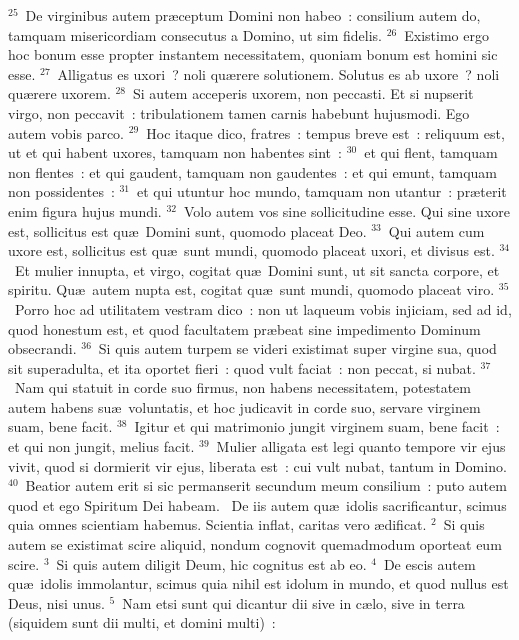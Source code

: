 ${}^{25}$~De virginibus autem pr\ae ceptum Domini non habeo~: consilium autem do, tamquam misericordiam consecutus a Domino, ut sim fidelis.
${}^{26}$~Existimo ergo hoc bonum esse propter instantem necessitatem, quoniam bonum est homini sic esse.
${}^{27}$~Alligatus es uxori~? noli qu\ae rere solutionem. Solutus es ab uxore~? noli qu\ae rere uxorem.
${}^{28}$~Si autem acceperis uxorem, non peccasti. Et si nupserit virgo, non peccavit~: tribulationem tamen carnis habebunt hujusmodi. Ego autem vobis parco.
${}^{29}$~Hoc itaque dico, fratres~: tempus breve est~: reliquum est, ut et qui habent uxores, tamquam non habentes sint~:
${}^{30}$~et qui flent, tamquam non flentes~: et qui gaudent, tamquam non gaudentes~: et qui emunt, tamquam non possidentes~:
${}^{31}$~et qui utuntur hoc mundo, tamquam non utantur~: pr\ae terit enim figura hujus mundi.
${}^{32}$~Volo autem vos sine sollicitudine esse. Qui sine uxore est, sollicitus est qu\ae\ Domini sunt, quomodo placeat Deo.
${}^{33}$~Qui autem cum uxore est, sollicitus est qu\ae\ sunt mundi, quomodo placeat uxori, et divisus est.
${}^{34}$~Et mulier innupta, et virgo, cogitat qu\ae\ Domini sunt, ut sit sancta corpore, et spiritu. Qu\ae\ autem nupta est, cogitat qu\ae\ sunt mundi, quomodo placeat viro.
${}^{35}$~Porro hoc ad utilitatem vestram dico~: non ut laqueum vobis injiciam, sed ad id, quod honestum est, et quod facultatem pr\ae beat sine impedimento Dominum obsecrandi.
${}^{36}$~Si quis autem turpem se videri existimat super virgine sua, quod sit superadulta, et ita oportet fieri~: quod vult faciat~: non peccat, si nubat.
${}^{37}$~Nam qui statuit in corde suo firmus, non habens necessitatem, potestatem autem habens su\ae\ voluntatis, et hoc judicavit in corde suo, servare virginem suam, bene facit.
${}^{38}$~Igitur et qui matrimonio jungit virginem suam, bene facit~: et qui non jungit, melius facit.
${}^{39}$~Mulier alligata est legi quanto tempore vir ejus vivit, quod si dormierit vir ejus, liberata est~: cui vult nubat, tantum in Domino.
${}^{40}$~Beatior autem erit si sic permanserit secundum meum consilium~: puto autem quod et ego Spiritum Dei habeam.
~De iis autem qu\ae\ idolis sacrificantur, scimus quia omnes scientiam habemus. Scientia inflat, caritas vero \ae dificat.
${}^{2}$~Si quis autem se existimat scire aliquid, nondum cognovit quemadmodum oporteat eum scire.
${}^{3}$~Si quis autem diligit Deum, hic cognitus est ab eo.
${}^{4}$~De escis autem qu\ae\ idolis immolantur, scimus quia nihil est idolum in mundo, et quod nullus est Deus, nisi unus.
${}^{5}$~Nam etsi sunt qui dicantur dii sive in c\ae lo, sive in terra (siquidem sunt dii multi, et domini multi)~:

